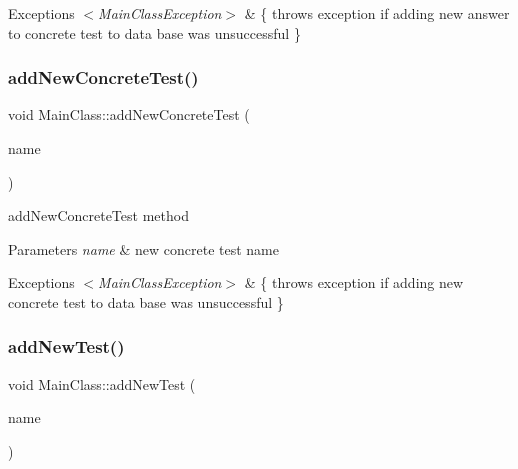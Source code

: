 \begin{DoxyExceptions}{Exceptions}
{\em $<$\+Main\+Class\+Exception$>$} & \{ throws exception if adding new answer to concrete test to data base was unsuccessful \} \\
\hline
\end{DoxyExceptions}
\mbox{\label{class_main_class_ab5b461aae89fc107477e954653e98ac0}} 
\subsubsection{\texorpdfstring{add\+New\+Concrete\+Test()}{addNewConcreteTest()}}
{\footnotesize\ttfamily void Main\+Class\+::add\+New\+Concrete\+Test (\begin{DoxyParamCaption}\item[{Q\+String}]{name }\end{DoxyParamCaption})}



add\+New\+Concrete\+Test method 


\begin{DoxyParams}{Parameters}
{\em name} & new concrete test name \\
\hline
\end{DoxyParams}

\begin{DoxyExceptions}{Exceptions}
{\em $<$\+Main\+Class\+Exception$>$} & \{ throws exception if adding new concrete test to data base was unsuccessful \} \\
\hline
\end{DoxyExceptions}
\mbox{\label{class_main_class_a138aab7a71f0fb928022d1e8ddb7064b}} 
\subsubsection{\texorpdfstring{add\+New\+Test()}{addNewTest()}}
{\footnotesize\ttfamily void Main\+Class\+::add\+New\+Test (\begin{DoxyParamCaption}\item[{const Q\+String \&}]{name }\end{DoxyParamCaption})}



